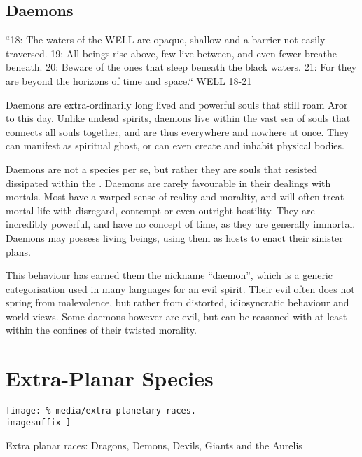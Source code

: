 \subsection{Daemons}
\label{sec:Daemons}

\begin{displayquote}
  ``18: The waters of the WELL are opaque, shallow and a barrier not easily
  traversed. 19: All beings rise above, few live between, and even fewer breathe
  beneath. 20: Beware of the ones that sleep beneath the black waters. 21: For
  they are beyond the horizons of time and space.`` WELL 18-21
\end{displayquote}

Daemons are extra-ordinarily long lived and powerful souls that still roam Aror
to this day. Unlike undead spirits, daemons live within the \hyperref[sec:Soul
  Well]{vast sea of souls} that connects all souls together, and are thus
everywhere and nowhere at once. They can manifest as spiritual ghost, or can
even create and inhabit physical bodies.

Daemons are not a species per se, but rather they are souls that resisted
dissipated within the . Daemons are rarely favourable
in their dealings with mortals. Most have a warped sense of reality and
morality, and will often treat mortal life with disregard, contempt or even
outright hostility. They are incredibly powerful, and have no concept of time,
as they are generally immortal. Daemons may possess living beings, using them
as hosts to enact their sinister plans.

This behaviour has earned them the nickname ``daemon'', which is a generic
categorisation used in many languages for an evil spirit. Their evil often
does not spring from malevolence, but rather from distorted, idiosyncratic
behaviour and world views. Some daemons however are evil, but can be reasoned
with at least within the confines of their twisted morality.






\section{Extra-Planar Species}
\label{sec:ExtraPlanar Species}

\ifimages
\begin{figure*}[ht!]
    \centering
    \vspace{-2.6cm}
    \centerline{
      \texttt{[image: \%
        media/extra-planetary-races.\\imagesuffix
      ]}
    }
    \par
    Extra planar races: Dragons, Demons, Devils, Giants and the Aurelis
\end{figure*}
\fi

